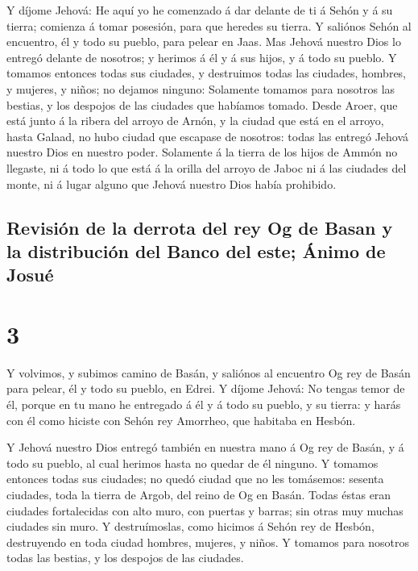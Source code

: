  Y díjome Jehová: He aquí yo he comenzado á dar delante de
ti á Sehón y á su tierra; comienza á tomar posesión, para que heredes su
tierra.  Y saliónos Sehón al encuentro, él y todo su
pueblo, para pelear en Jaas.  Mas Jehová nuestro Dios lo
entregó delante de nosotros; y herimos á él y á sus hijos, y á todo su
pueblo.  Y tomamos entonces todas sus ciudades, y
destruimos todas las ciudades, hombres, y mujeres, y niños; no dejamos
ninguno:  Solamente tomamos para nosotros las bestias, y
los despojos de las ciudades que habíamos tomado.  Desde
Aroer, que está junto á la ribera del arroyo de Arnón, y la ciudad que
está en el arroyo, hasta Galaad, no hubo ciudad que escapase de
nosotros: todas las entregó Jehová nuestro Dios en nuestro poder.
 Solamente á la tierra de los hijos de Ammón no llegaste,
ni á todo lo que está á la orilla del arroyo de Jaboc ni á las ciudades
del monte, ni á lugar alguno que Jehová nuestro Dios había prohibido.

\hypertarget{revisiuxf3n-de-la-derrota-del-rey-og-de-basan-y-la-distribuciuxf3n-del-banco-del-este-uxe1nimo-de-josuuxe9}{%
\subsection{Revisión de la derrota del rey Og de Basan y la distribución
del Banco del este; Ánimo de
Josué}\label{revisiuxf3n-de-la-derrota-del-rey-og-de-basan-y-la-distribuciuxf3n-del-banco-del-este-uxe1nimo-de-josuuxe9}}

\hypertarget{section-2}{%
\section{3}\label{section-2}}

 Y volvimos, y subimos camino de Basán, y saliónos al
encuentro Og rey de Basán para pelear, él y todo su pueblo, en Edrei.
 Y díjome Jehová: No tengas temor de él, porque en tu mano
he entregado á él y á todo su pueblo, y su tierra: y harás con él como
hiciste con Sehón rey Amorrheo, que habitaba en Hesbón.

 Y Jehová nuestro Dios entregó también en nuestra mano á Og
rey de Basán, y á todo su pueblo, al cual herimos hasta no quedar de él
ninguno.  Y tomamos entonces todas sus ciudades; no quedó
ciudad que no les tomásemos: sesenta ciudades, toda la tierra de Argob,
del reino de Og en Basán.  Todas éstas eran ciudades
fortalecidas con alto muro, con puertas y barras; sin otras muy muchas
ciudades sin muro.  Y destruímoslas, como hicimos á Sehón
rey de Hesbón, destruyendo en toda ciudad hombres, mujeres, y niños.
 Y tomamos para nosotros todas las bestias, y los despojos
de las ciudades.

